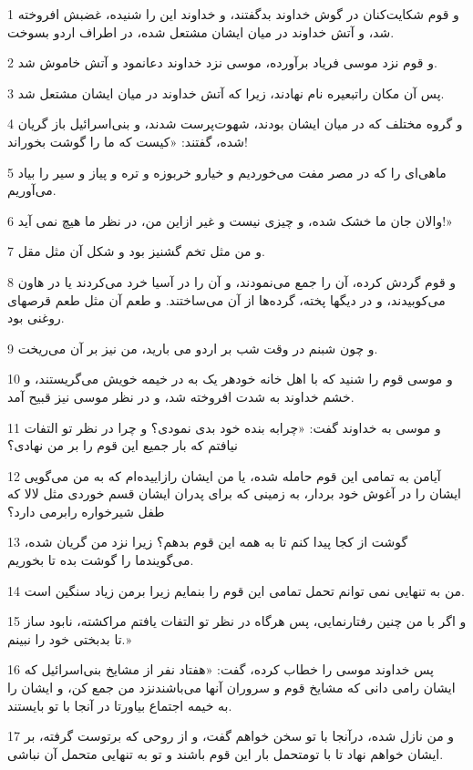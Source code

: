 \par 1 و قوم شکایت‌کنان در گوش خداوند بدگفتند، و خداوند این را شنیده، غضبش افروخته شد، و آتش خداوند در میان ایشان مشتعل شده، در اطراف اردو بسوخت.
\par 2 و قوم نزد موسی فریاد برآورده، موسی نزد خداوند دعانمود و آتش خاموش شد.
\par 3 پس آن مکان راتبعیره نام نهادند، زیرا که آتش خداوند در میان ایشان مشتعل شد.
\par 4 و گروه مختلف که در میان ایشان بودند، شهوت‌پرست شدند، و بنی‌اسرائیل باز گریان شده، گفتند: «کیست که ما را گوشت بخوراند!
\par 5 ماهی‌ای را که در مصر مفت می‌خوردیم و خیارو خربوزه و تره و پیاز و سیر را بیاد می‌آوریم.
\par 6 والان جان ما خشک شده، و چیزی نیست و غیر ازاین من، در نظر ما هیچ نمی آید!»
\par 7 و من مثل تخم گشنیز بود و شکل آن مثل مقل.
\par 8 و قوم گردش کرده، آن را جمع می‌نمودند، و آن را در آسیا خرد می‌کردند یا در هاون می‌کوبیدند، و در دیگها پخته، گرده‌ها از آن می‌ساختند. و طعم آن مثل طعم قرصهای روغنی بود.
\par 9 و چون شبنم در وقت شب بر اردو می بارید، من نیز بر آن می‌ریخت.
\par 10 و موسی قوم را شنید که با اهل خانه خودهر یک به در خیمه خویش می‌گریستند، و خشم خداوند به شدت افروخته شد، و در نظر موسی نیز قبیح آمد.
\par 11 و موسی به خداوند گفت: «چرابه بنده خود بدی نمودی؟ و چرا در نظر تو التفات نیافتم که بار جمیع این قوم را بر من نهادی؟
\par 12 آیامن به تمامی این قوم حامله شده، یا من ایشان رازاییده‌ام که به من می‌گویی ایشان را در آغوش خود بردار، به زمینی که برای پدران ایشان قسم خوردی مثل لالا که طفل شیرخواره رابرمی دارد؟
\par 13 گوشت از کجا پیدا کنم تا به همه این قوم بدهم؟ زیرا نزد من گریان شده، می‌گویندما را گوشت بده تا بخوریم.
\par 14 من به تنهایی نمی توانم تحمل تمامی این قوم را بنمایم زیرا برمن زیاد سنگین است.
\par 15 و اگر با من چنین رفتارنمایی، پس هرگاه در نظر تو التفات یافتم مراکشته، نابود ساز تا بدبختی خود را نبینم.»
\par 16 پس خداوند موسی را خطاب کرده، گفت: «هفتاد نفر از مشایخ بنی‌اسرائیل که ایشان رامی دانی که مشایخ قوم و سروران آنها می‌باشندنزد من جمع کن، و ایشان را به خیمه اجتماع بیاورتا در آنجا با تو بایستند.
\par 17 و من نازل شده، درآنجا با تو سخن خواهم گفت، و از روحی که برتوست گرفته، بر ایشان خواهم نهاد تا با تومتحمل بار این قوم باشند و تو به تنهایی متحمل آن نباشی.
